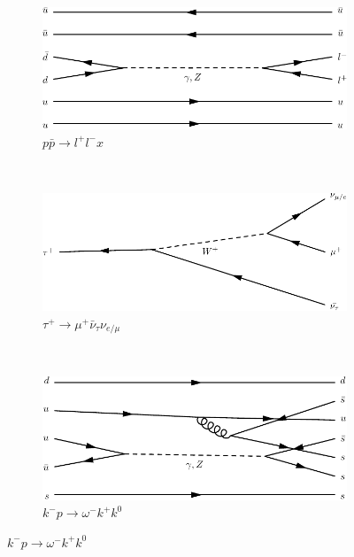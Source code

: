 \begin{figure}[h]
\begin{subfigure}[b]{0.3\textwidth}
    \label{fey:3}
  \end{subfigure}
  \newline
  \newline
  \begin{subfigure}[b]{0.3\textwidth}
    \includegraphics[width=\textwidth]{../dia/04.pdf}
    \caption{$p\bar{p}\rightarrow l^+l^-x$}
    \label{fey:4}
  \end{subfigure}%
  ~
  \begin{subfigure}[b]{0.3\textwidth}
    \includegraphics[width=\textwidth]{../dia/05.pdf}
    \caption{$\tau^+\rightarrow \mu^+\bar{\nu}_{\tau}\nu_{e/\mu}$}
    \label{fey:5}
  \end{subfigure}%
  ~
  \begin{subfigure}[b]{0.3\textwidth}
    \includegraphics[width=\textwidth]{../dia/06.pdf}
    \caption{$k^-p\rightarrow \omega^-k^+k^0$}
    \label{fey:6}
  \end{subfigure}
  \newline

\end{figure}
